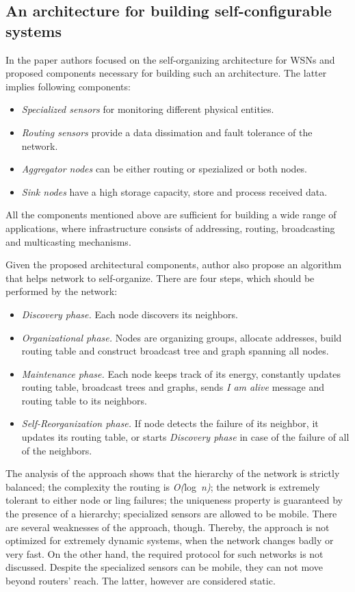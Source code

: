 \subsection{An architecture for building self-configurable systems}

In the paper authors focused on the self-organizing architecture for WSNs and
proposed components necessary for building such an architecture. The latter
implies following components:

\begin{itemize}
\item \emph{Specialized sensors} for monitoring different physical entities.
\item \emph{Routing sensors} provide a data dissimation and fault tolerance of the network.
\item \emph{Aggregator nodes} can be either routing or spezialized or both nodes.
\item \emph{Sink nodes} have a high storage capacity, store and process received data.
\end{itemize}
All the components mentioned above are sufficient for building a wide range of
applications, where infrastructure consists of addressing, routing, broadcasting
and multicasting mechanisms.

Given the proposed architectural components, author also propose an algorithm
that helps network to self-organize. There are four steps, which should be
performed by the network:

\begin{itemize}
\item \emph{Discovery phase.} Each node discovers its neighbors.
\item \emph{Organizational phase.} Nodes are organizing groups, allocate
addresses, build routing table and construct broadcast tree and graph spanning
all nodes.
\item \emph{Maintenance phase.} Each node keeps track of its energy, constantly
updates routing table, broadcast trees and graphs, sends \emph{I am alive}
message and routing table to its neighbors.
\item \emph{Self-Reorganization phase.} If node detects the failure of its
neighbor, it updates its routing table, or starts \emph{Discovery phase} in case
of the failure of all of the neighbors.
\end{itemize}

The analysis of the approach shows that the hierarchy of the network is strictly
balanced; the complexity the routing is \emph{O(}log~\emph{n)}; the network is
extremely tolerant to either node or ling failures; the uniqueness property is
guaranteed by the presence of a hierarchy; specialized sensors are allowed to be
mobile. There are several weaknesses of the approach, though. Thereby,
the approach is not optimized for extremely dynamic systems, when the network
changes badly or very fast. On the other hand, the required protocol for such
networks is not discussed. Despite the specialized sensors can be mobile, they
can not move beyond routers' reach. The latter, however are considered static.